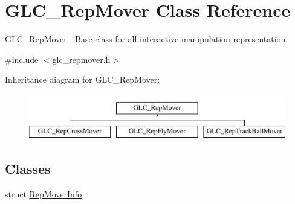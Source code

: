 \hypertarget{class_g_l_c___rep_mover}{\section{G\-L\-C\-\_\-\-Rep\-Mover Class Reference}
\label{class_g_l_c___rep_mover}
}


\hyperlink{class_g_l_c___rep_mover}{G\-L\-C\-\_\-\-Rep\-Mover} \-: Base class for all interactive manipulation representation.  




{\ttfamily \#include $<$glc\-\_\-repmover.\-h$>$}

Inheritance diagram for G\-L\-C\-\_\-\-Rep\-Mover\-:\begin{figure}[H]
\begin{center}
\leavevmode
\includegraphics[height=2.000000cm]{class_g_l_c___rep_mover}
\end{center}
\end{figure}
\subsection*{Classes}
\begin{DoxyCompactItemize}
\item 
struct \hyperlink{struct_g_l_c___rep_mover_1_1_rep_mover_info}{Rep\-Mover\-Info}
\end{DoxyCompactItemize}
